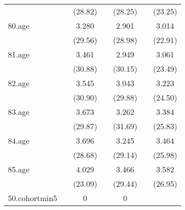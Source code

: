 {\begin{tabular}{l*{6}{c}}
            &                     &     (28.82)         &                     &     (28.25)         &                     &     (23.25)         \\
[1em]
80.age      &                     &       3.280\sym{***}&                     &       2.901\sym{***}&                     &       3.014\sym{***}\\
            &                     &     (29.56)         &                     &     (28.98)         &                     &     (22.91)         \\
[1em]
81.age      &                     &       3.461\sym{***}&                     &       2.949\sym{***}&                     &       3.061\sym{***}\\
            &                     &     (30.88)         &                     &     (30.15)         &                     &     (23.49)         \\
[1em]
82.age      &                     &       3.545\sym{***}&                     &       3.043\sym{***}&                     &       3.223\sym{***}\\
            &                     &     (30.90)         &                     &     (29.88)         &                     &     (24.50)         \\
[1em]
83.age      &                     &       3.673\sym{***}&                     &       3.262\sym{***}&                     &       3.384\sym{***}\\
            &                     &     (29.87)         &                     &     (31.69)         &                     &     (25.83)         \\
[1em]
84.age      &                     &       3.696\sym{***}&                     &       3.245\sym{***}&                     &       3.464\sym{***}\\
            &                     &     (28.68)         &                     &     (29.14)         &                     &     (25.98)         \\
[1em]
85.age      &                     &       4.029\sym{***}&                     &       3.466\sym{***}&                     &       3.582\sym{***}\\
            &                     &     (23.09)         &                     &     (29.44)         &                     &     (26.95)         \\
[1em]
50.cohortmin5&                     &           0         &                     &           0         &                     &                     \\

\end{tabular}}
